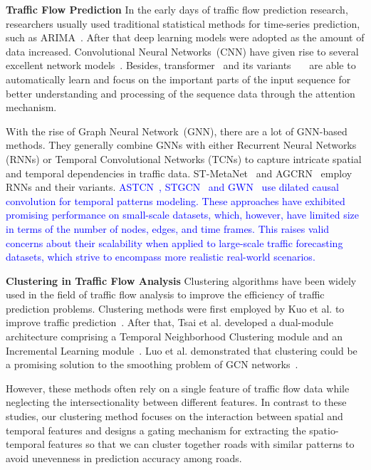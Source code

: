 \documentclass[lettersize,journal]{IEEEtran}
\begin{document}
\textbf{Traffic Flow Prediction}
In the early days of traffic flow prediction research, researchers usually used traditional statistical methods for time-series prediction, such as ARIMA~\cite{arima}. After that deep learning models were adopted as the amount of data increased. Convolutional Neural Networks~(CNN) have given rise to several excellent network models~\cite{DBLP:conf/iclr/WuHLZ0L23}. Besides, transformer~\cite{DBLP:conf/nips/VaswaniSPUJGKP17} and its variants~\cite{nips/LiJXZCWY19}~\cite{DBLP:conf/pkdd/FanYCWZWDZZ23}~\cite{DBLP:conf/aaai/JiangHZW23} are able to automatically learn and focus on the important parts of the input sequence for better understanding and processing of the sequence data through the attention mechanism. 

With the rise of Graph Neural Network~(GNN), there are a lot of GNN-based methods. They generally combine GNNs with either Recurrent Neural Networks (RNNs) or Temporal Convolutional Networks (TCNs) to capture intricate spatial and temporal dependencies in traffic data. ST-MetaNet~\cite{pan_urban_2019} and AGCRN~\cite{10.5555/3495724.3497218} employ RNNs and their variants. \textcolor{blue}{ASTCN~\cite{DBLP:conf/icdm/Zhang0SG021}, STGCN~\cite{stgcn} and GWN~\cite{graphwave} use dilated causal convolution for temporal patterns modeling. These approaches have exhibited promising performance on small-scale datasets, which, however, have limited size in terms of the number of nodes, edges, and time frames. This raises valid concerns about their scalability when applied to large-scale traffic forecasting datasets, which strive to encompass more realistic real-world scenarios.}

\textbf{Clustering in Traffic Flow Analysis}
Clustering algorithms have been widely used in the field of traffic flow analysis to improve the efficiency of traffic prediction problems. Clustering methods were first employed by Kuo et al. to improve traffic prediction~\cite{kuo_adaptive_2001}. After that, Tsai et al. developed a dual-module architecture comprising a Temporal Neighborhood Clustering module and an Incremental Learning module~\cite{tsai_incremental_2022}. Luo et al. demonstrated that clustering could be a promising solution to the smoothing problem of GCN networks~\cite{luo_clusterst_2023}.

However, these methods often rely on a single feature of traffic flow data while neglecting the intersectionality between different features. In contrast to these studies, our clustering method focuses on the interaction between spatial and temporal features and designs a gating mechanism for extracting the spatio-temporal features so that we can cluster together roads with similar patterns to avoid unevenness in prediction accuracy among roads.
\end{document}
